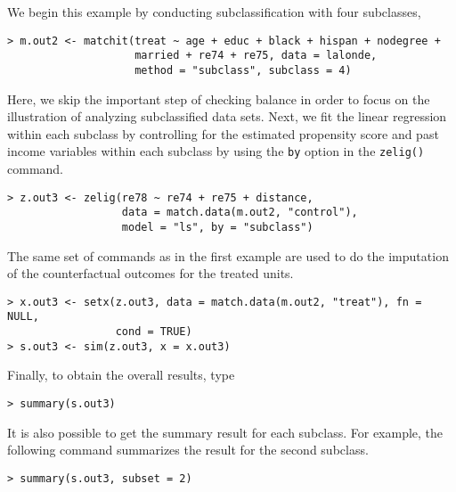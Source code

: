 \begin{enumerate}
  We begin this example by conducting subclassification with four
  subclasses,
\begin{verbatim}
> m.out2 <- matchit(treat ~ age + educ + black + hispan + nodegree + 
                    married + re74 + re75, data = lalonde, 
                    method = "subclass", subclass = 4)
\end{verbatim}
  Here, we skip the important step of checking balance in order to
  focus on the illustration of analyzing subclassified data sets.
  Next, we fit the linear regression within each subclass by
  controlling for the estimated propensity score and past income
  variables within each subclass by using the {\tt by} option in the
  {\tt zelig()} command.
\begin{verbatim}
> z.out3 <- zelig(re78 ~ re74 + re75 + distance, 
                  data = match.data(m.out2, "control"), 
                  model = "ls", by = "subclass")
\end{verbatim}
  The same set of commands as in the first example are used to do the
  imputation of the counterfactual outcomes for the treated units.
\begin{verbatim}
> x.out3 <- setx(z.out3, data = match.data(m.out2, "treat"), fn = NULL, 
                 cond = TRUE)
> s.out3 <- sim(z.out3, x = x.out3)
\end{verbatim}
Finally, to obtain the overall results, type
\begin{verbatim}
> summary(s.out3)
\end{verbatim}
It is also possible to get the summary result for each subclass. For
example, the following command summarizes the result for the second
subclass.
\begin{verbatim}
> summary(s.out3, subset = 2)
\end{verbatim}
  
\end{enumerate}


